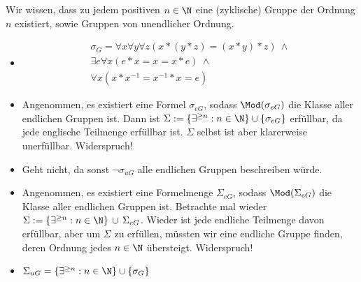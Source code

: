 \begin{solution}
Wir wissen, dass zu jedem positiven $n \in \N$ eine (zyklische) Gruppe der Ordnung $n$
existiert, sowie Gruppen von unendlicher Ordnung.
\begin{itemize}
  \item
  \begin{align*}
    \sigma_G = \forall x \forall y \forall z (x*(y*z) = (x*y)*z)\ \land \\
    \exists e \forall x (e*x = x = x*e)\ \land \\
    \forall x (x * x^{-1} = x^{-1} * x = e)
  \end{align*}
  \item Angenommen, es existiert eine Formel $\sigma_{eG}$, sodass $\Mod(\sigma_{eG})$
  die Klasse aller endlichen Gruppen ist. Dann ist $\Sigma := \{\exists^{\geq n}: n \in \N\} \cup \{\sigma_{eG}\}$ erfüllbar, da jede englische Teilmenge erfüllbar ist.
  $\Sigma$ selbst ist aber klarerweise unerfüllbar. Widerspruch!
  \item Geht nicht, da sonst $\neg \sigma_{uG}$ alle endlichen Gruppen beschreiben würde.
  \item Angenommen, es existiert eine Formelmenge $\Sigma_{eG}$, sodass $\Mod(\Sigma_{eG})$
  die Klasse aller endlichen Gruppen ist.
  Betrachte mal wieder $\Sigma := \{\exists^{\geq n}: n \in \N\}\, \cup\, \Sigma_{eG}$.
  Wieder ist jede endliche Teilmenge davon erfüllbar, aber um $\Sigma$ zu erfüllen,
  müssten wir eine endliche Gruppe finden, deren Ordnung jedes $n \in \N$ übersteigt.
  Widerspruch!
  \item $\Sigma_{uG} = \{\exists^{\geq n}: n \in \N\} \cup \{\sigma_G\}$
\end{itemize}

\end{solution}

